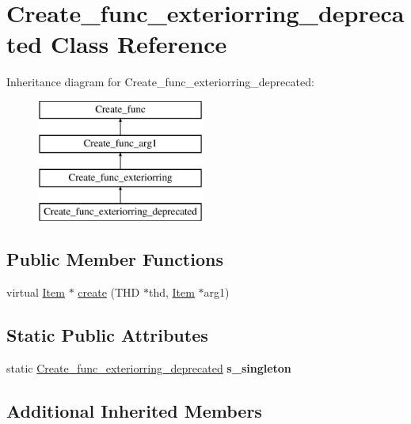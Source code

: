 \hypertarget{classCreate__func__exteriorring__deprecated}{}\section{Create\+\_\+func\+\_\+exteriorring\+\_\+deprecated Class Reference}
\label{classCreate__func__exteriorring__deprecated}
Inheritance diagram for Create\+\_\+func\+\_\+exteriorring\+\_\+deprecated\+:\begin{figure}[H]
\begin{center}
\leavevmode
\includegraphics[height=4.000000cm]{classCreate__func__exteriorring__deprecated}
\end{center}
\end{figure}
\subsection*{Public Member Functions}
\begin{DoxyCompactItemize}
\item 
virtual \mbox{\hyperlink{classItem}{Item}} $\ast$ \mbox{\hyperlink{classCreate__func__exteriorring__deprecated_afec0600433348b5b76dec6b08d320a46}{create}} (T\+HD $\ast$thd, \mbox{\hyperlink{classItem}{Item}} $\ast$arg1)
\end{DoxyCompactItemize}
\subsection*{Static Public Attributes}
\begin{DoxyCompactItemize}
\item 
\mbox{\label{classCreate__func__exteriorring__deprecated_a76c98f34ad420763201cea7d18ed4611}} 
static \mbox{\hyperlink{classCreate__func__exteriorring__deprecated}{Create\+\_\+func\+\_\+exteriorring\+\_\+deprecated}} {\bfseries s\+\_\+singleton}
\end{DoxyCompactItemize}
\subsection*{Additional Inherited Members}


